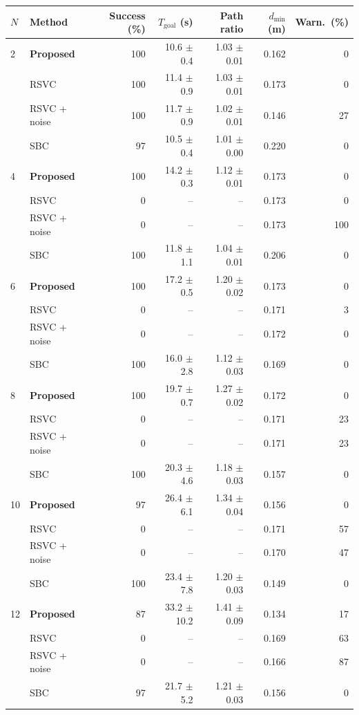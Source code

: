 \begin{tabular}{@{}llrrrrr@{}}
\toprule
$N$ & \textbf{Method} & \textbf{Success (\%)} & $T_{\mathrm{goal}}$ (s) & \textbf{Path ratio} & $d_{\min}$ (m) & \textbf{Warn.\ (\%)} \\
\midrule
2 & \textbf{Proposed} & 100 & 10.6 $\pm$ 0.4 & 1.03 $\pm$ 0.01 & 0.162 & 0 \\
 & RSVC & 100 & 11.4 $\pm$ 0.9 & 1.03 $\pm$ 0.01 & 0.173 & 0 \\
 & RSVC + noise & 100 & 11.7 $\pm$ 0.9 & 1.02 $\pm$ 0.01 & 0.146 & 27 \\
 & SBC & 97 & 10.5 $\pm$ 0.4 & 1.01 $\pm$ 0.00 & 0.220 & 0 \\
\midrule
4 & \textbf{Proposed} & 100 & 14.2 $\pm$ 0.3 & 1.12 $\pm$ 0.01 & 0.173 & 0 \\
 & RSVC & 0 & -- & -- & 0.173 & 0 \\
 & RSVC + noise & 0 & -- & -- & 0.173 & 100 \\
 & SBC & 100 & 11.8 $\pm$ 1.1 & 1.04 $\pm$ 0.01 & 0.206 & 0 \\
\midrule
6 & \textbf{Proposed} & 100 & 17.2 $\pm$ 0.5 & 1.20 $\pm$ 0.02 & 0.173 & 0 \\
 & RSVC & 0 & -- & -- & 0.171 & 3 \\
 & RSVC + noise & 0 & -- & -- & 0.172 & 0 \\
 & SBC & 100 & 16.0 $\pm$ 2.8 & 1.12 $\pm$ 0.03 & 0.169 & 0 \\
\midrule
8 & \textbf{Proposed} & 100 & 19.7 $\pm$ 0.7 & 1.27 $\pm$ 0.02 & 0.172 & 0 \\
 & RSVC & 0 & -- & -- & 0.171 & 23 \\
 & RSVC + noise & 0 & -- & -- & 0.171 & 23 \\
 & SBC & 100 & 20.3 $\pm$ 4.6 & 1.18 $\pm$ 0.03 & 0.157 & 0 \\
\midrule
10 & \textbf{Proposed} & 97 & 26.4 $\pm$ 6.1 & 1.34 $\pm$ 0.04 & 0.156 & 0 \\
 & RSVC & 0 & -- & -- & 0.171 & 57 \\
 & RSVC + noise & 0 & -- & -- & 0.170 & 47 \\
 & SBC & 100 & 23.4 $\pm$ 7.8 & 1.20 $\pm$ 0.03 & 0.149 & 0 \\
\midrule
12 & \textbf{Proposed} & 87 & 33.2 $\pm$ 10.2 & 1.41 $\pm$ 0.09 & 0.134 & 17 \\
 & RSVC & 0 & -- & -- & 0.169 & 63 \\
 & RSVC + noise & 0 & -- & -- & 0.166 & 87 \\
 & SBC & 97 & 21.7 $\pm$ 5.2 & 1.21 $\pm$ 0.03 & 0.156 & 0 \\
\bottomrule
\end{tabular}
